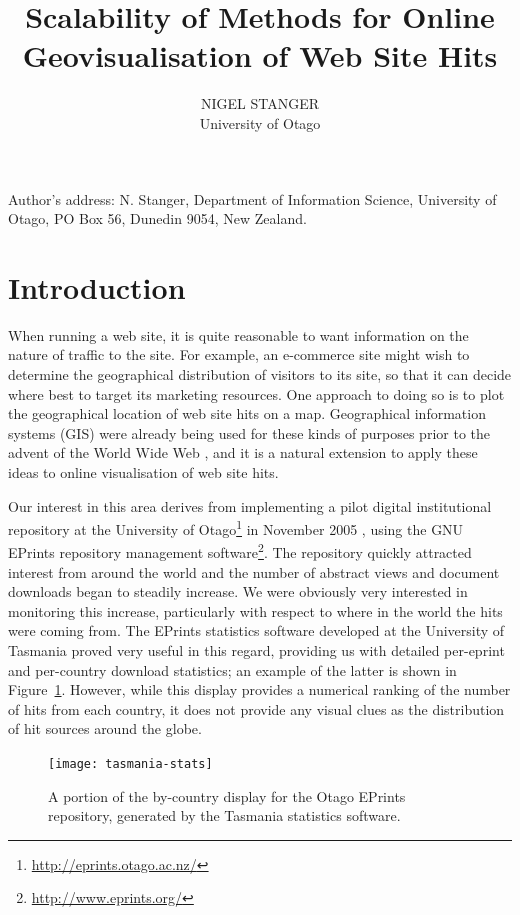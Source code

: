 \documentclass[acmtocl,acmnow]{acmtrans2m}
\title{Scalability of Methods for Online Geovisualisation of Web Site Hits}
\author{NIGEL STANGER \\ University of Otago}
\begin{document}


            
\begin{bottomstuff} 
Author's address: N. Stanger, Department of Information Science,
University of Otago, PO Box 56, Dunedin 9054, New Zealand.
\end{bottomstuff}
            
\maketitle


\section{Introduction}
\label{sec-introduction}

When running a web site, it is quite reasonable to want information on
the nature of traffic to the site. For example, an e-commerce site might
wish to determine the geographical distribution of visitors to its site,
so that it can decide where best to target its marketing resources. One
approach to doing so is to plot the geographical location of web site
hits on a map. Geographical information systems (GIS) were already being
used for these kinds of purposes prior to the advent of the World Wide
Web \cite{Beau-JR-1991-GIS}, and it is a natural extension to apply
these ideas to online visualisation of web site hits.

Our interest in this area derives from implementing a pilot digital
institutional repository at the University of
Otago\footnote{\url{http://eprints.otago.ac.nz/}} in November 2005
\cite{Stan-N-2006-running}, using the GNU EPrints repository management
software\footnote{\url{http://www.eprints.org/}}. The repository quickly
attracted interest from around the world and the number of abstract
views and document downloads began to steadily increase. We were
obviously very interested in monitoring this increase, particularly with
respect to where in the world the hits were coming from. The EPrints
statistics software developed at the University of Tasmania
\cite{Sale-A-2006-stats} proved very useful in this regard, providing us
with detailed per-eprint and per-country download statistics; an example
of the latter is shown in Figure~\ref{fig-tas-stats}. However, while
this display provides a numerical ranking of the number of hits from
each country, it does not provide any visual clues as the distribution
of hit sources around the globe.


\begin{figure}
	\begin{center}
		\texttt{[image: tasmania-stats]}
	\end{center}
	\caption{A portion of the by-country display for the Otago EPrints
	repository, generated by the Tasmania statistics software.}
	\label{fig-tas-stats}
\end{figure}
\end{document}

